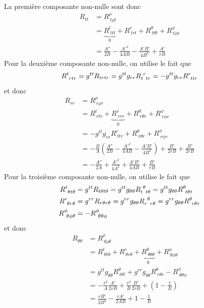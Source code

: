\documentclass[a4paper,11pt]{report}
\begin{document}
        La première composante non-nulle sont donc
        \begin{align}
            R_{tt} &= R^\rho_{~t\rho t}\\
            &= \underbrace{R^t_{~tt t}}_{0} + R^r_{~tr t} + R^\theta_{~t\theta t} + R^\phi_{~t\phi t}\\
            &= \frac{A''}{2B}-\frac{A'^2}{4AB}-\frac{A'B'}{4B^2}+\frac{A'}{rB}
        \end{align}
        Pour la deuxième composante non-nulle, on utilise le fait que 
        \begin{equation}
            R^t_{~rtr} = g^{tt}R_{trtr} = g^{tt}g_{rr} R\indices{_t^r_t_r} = -g^{tt}g_{rr}R^r_{~ttr}
        \end{equation}
        et donc
        \begin{align}
            R_{rr} &= R^\rho_{~r\rho r}\\
            &= R^t_{~rtr} + \underbrace{R^r_{~rrr}}_{0} + R^\theta_{~r\theta r} + R^\phi_{~r\phi r}\\
            &= -g^{tt}g_{rr}R^r_{~ttr} + R^\theta_{~r\theta r} + R^\phi_{~r\phi r}\\
            &= -\frac{B}{A}\left(  \frac{A''}{2B}-\frac{A'^2}{4AB}-\frac{A'B'}{4B^2} \right)+\frac{B'}{2rB}+\frac{B'}{2rB}\\
            &= -\frac{A''}{2A}+\frac{A'^2}{4A^2}+\frac{A'B'}{4AB}+\frac{B'}{rB}
        \end{align}
        Pour la troisième composante non-nulle, on utilise le fait que
        \begin{align}
             R^t_{~\theta t\theta} &= g^{tt}R_{t\theta t\theta} = g^{tt}g_{\theta \theta}R\indices{_t^\theta_t_\theta} = g^{tt}g_{\theta\theta}R^\theta_{~t \theta t} \\
            R^r_{~\theta r\theta} &= g^{rr}R_{r\theta r\theta} = g^{rr}g_{\theta\theta}R\indices{_r^\theta_r_\theta} = g^{rr}g_{\theta\theta} R^\theta_{~r\theta r}\\
            R^\phi_{~\theta\phi\theta} &= -R^\phi_{~\theta\theta\phi}
        \end{align}
        et donc
        \begin{align}
            R_{\theta\theta} &= R^\rho_{~\theta\rho\theta}\\
            &= R^t_{~\theta t\theta} + R^r_{~\theta r\theta}+ \underbrace{R^\theta_{~\theta\theta\theta}}_{0} + R^\phi_{~\theta\phi\theta}\\
            &= g^{tt}g_{\theta\theta}R^\theta_{~t \theta t} + g^{rr}g_{\theta\theta} R^\theta_{~r\theta r} -R^\phi_{~\theta\theta\phi}\\
            &=-\frac{r^2}{A}\frac{A'}{2rB}+\frac{r^2}{B}\frac{B'}{2rB}+\left( 1-\frac{1}{B} \right)\\
            &= \frac{rB'}{2B^2}-\frac{rA'}{2AB}+1-\frac{1}{B}
        \end{align}
\end{document}
